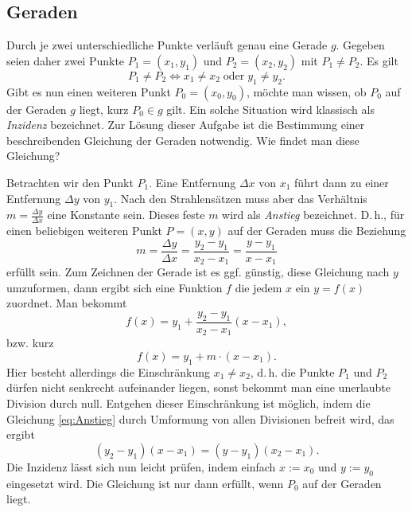 \subsection{Geraden}

Durch je zwei unterschiedliche Punkte verläuft genau eine Gerade $g$.
Gegeben seien daher zwei Punkte $P_1=(x_1,y_1)$ und $P_2=(x_2,y_2)$
mit $P_1\ne P_2$. Es gilt%
\begin{equation}
P_1\ne P_2 \iff x_1\ne x_2\;\text{oder}\; y_1\ne y_2.
\end{equation}
Gibt es nun einen weiteren Punkt $P_0=(x_0,y_0)$, möchte man wissen, ob
$P_0$ auf der Geraden $g$ liegt, kurz $P_0\in g$ gilt. Ein solche
Situation wird klassisch als \emph{Inzidenz} bezeichnet. Zur Lösung
dieser Aufgabe ist die Bestimmung einer beschreibenden Gleichung
der Geraden notwendig. Wie findet man diese Gleichung?

Betrachten wir den Punkt $P_1$. Eine Entfernung $\Delta x$ von $x_1$
führt dann zu einer Entfernung $\Delta y$ von $y_1$. Nach den
Strahlensätzen muss aber das Verhältnis $m=\frac{\Delta y}{\Delta x}$
eine Konstante sein. Dieses feste $m$ wird als \emph{Anstieg}
bezeichnet. D.\,h., für einen beliebigen weiteren
Punkt $P=(x,y)$ auf der Geraden muss die Beziehung%
\begin{equation}\label{eq:Anstieg}
m = \frac{\Delta y}{\Delta x} = \frac{y_2-y_1}{x_2-x_1}
= \frac{y-y_1}{x-x_1}
\end{equation}
erfüllt sein. Zum Zeichnen der Gerade ist es ggf. günstig,
diese Gleichung nach $y$ umzuformen, dann ergibt sich eine
Funktion $f$ die jedem $x$ ein $y=f(x)$ zuordnet. Man bekommt%
\begin{equation}
f(x) = y_1+\frac{y_2-y_1}{x_2-x_1}(x-x_1),
\end{equation}
bzw. kurz
\begin{equation}
f(x) = y_1+m\cdot (x-x_1).
\end{equation}
Hier besteht allerdings die Einschränkung $x_1\ne x_2$, d.\,h. die
Punkte $P_1$ und $P_2$ dürfen nicht senkrecht aufeinander liegen,
sonst bekommt man eine unerlaubte Division durch null. Entgehen dieser
Einschränkung ist möglich, indem die Gleichung \eqref{eq:Anstieg}
durch Umformung von allen Divisionen befreit wird, das ergibt%
\begin{equation}
(y_2-y_1)(x-x_1) = (y-y_1)(x_2-x_1).
\end{equation}
Die Inzidenz lässt sich nun leicht prüfen, indem einfach
$x:=x_0$ und $y:=y_0$ eingesetzt wird. Die Gleichung ist nur
dann erfüllt, wenn $P_0$ auf der Geraden liegt.


